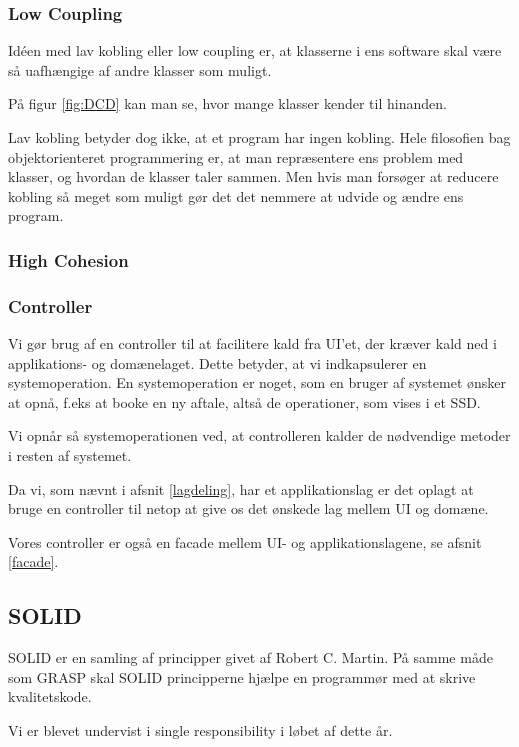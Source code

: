 \subsubsection{Low Coupling}
Idéen med lav kobling eller low coupling er, at klasserne i ens software skal være så uafhængige af andre klasser som muligt.

På figur \ref{fig:DCD} kan man se, hvor mange klasser kender til hinanden.

Lav kobling betyder dog ikke, at et program har ingen kobling.
Hele filosofien bag objektorienteret programmering er, at man repræsentere ens problem med klasser, og hvordan de klasser taler sammen.
Men hvis man forsøger at reducere kobling så meget som muligt gør det det nemmere at udvide og ændre ens program.

\subsubsection{High Cohesion}


\subsubsection{Controller}
\label{controller}
Vi gør brug af en controller til at facilitere kald fra UI'et, der kræver kald ned i applikations- og domænelaget.
Dette betyder, at vi indkapsulerer en systemoperation.
En systemoperation er noget, som en bruger af systemet ønsker at opnå, f.eks at booke en ny aftale, altså de operationer, som vises i et SSD.

Vi opnår så systemoperationen ved, at controlleren kalder de nødvendige metoder i resten af systemet.

Da vi, som nævnt i afsnit \ref{lagdeling}, har et applikationslag er det oplagt at bruge en controller til netop at give os det ønskede lag mellem UI og domæne.

Vores controller er også en facade mellem UI- og applikationslagene, se afsnit \ref{facade}.

\subsection{SOLID}
\label{solid}

SOLID er en samling af principper givet af Robert C. Martin.
På samme måde som GRASP skal SOLID principperne hjælpe en programmør med at skrive kvalitetskode.

Vi er blevet undervist i single responsibility i løbet af dette år.

